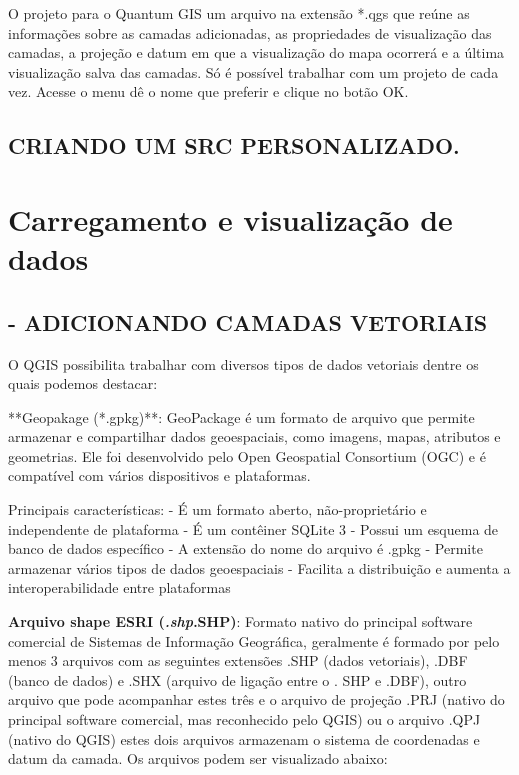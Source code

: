 \documentclass[
  11pt,
  a4paper,
]{book}
\begin{document}
O projeto para o Quantum GIS um arquivo na extensão *.qgs que reúne as
informações sobre as camadas adicionadas, as propriedades de
visualização das camadas, a projeção e datum em que a visualização do
mapa ocorrerá e a última visualização salva das camadas. Só é possível
trabalhar com um projeto de cada vez. Acesse o menu dê o nome que
preferir e clique no botão OK.

\chapter{CRIANDO UM SRC
PERSONALIZADO.}\label{criando-um-src-personalizado.}

\part{Carregamento e visualização de dados}

\chapter{- ADICIONANDO CAMADAS
VETORIAIS}\label{adicionando-camadas-vetoriais}

O QGIS possibilita trabalhar com diversos tipos de dados vetoriais
dentre os quais podemos destacar:

**Geopakage (*.gpkg)**: GeoPackage é um formato de arquivo que permite
armazenar e compartilhar dados geoespaciais, como imagens, mapas,
atributos e geometrias. Ele foi desenvolvido pelo Open Geospatial
Consortium (OGC) e é compatível com vários dispositivos e plataformas.

Principais características: - É um formato aberto, não-proprietário e
independente de plataforma - É um contêiner SQLite 3 - Possui um esquema
de banco de dados específico - A extensão do nome do arquivo é .gpkg -
Permite armazenar vários tipos de dados geoespaciais - Facilita a
distribuição e aumenta a interoperabilidade entre plataformas

\textbf{Arquivo shape ESRI (\emph{.shp}.SHP)}: Formato nativo do
principal software comercial de Sistemas de Informação Geográfica,
geralmente é formado por pelo menos 3 arquivos com as seguintes
extensões .SHP (dados vetoriais), .DBF (banco de dados) e .SHX (arquivo
de ligação entre o . SHP e .DBF), outro arquivo que pode acompanhar
estes três e o arquivo de projeção .PRJ (nativo do principal software
comercial, mas reconhecido pelo QGIS) ou o arquivo .QPJ (nativo do QGIS)
estes dois arquivos armazenam o sistema de coordenadas e datum da
camada. Os arquivos podem ser visualizado abaixo:
\end{document}
